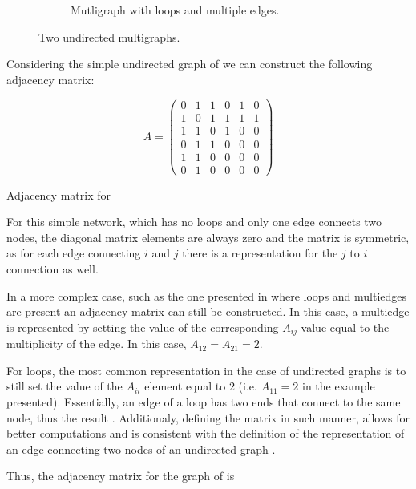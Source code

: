 \begin{figure}
\begin{subfigure}[t]{0.4\textwidth}
         \caption{Mutligraph with loops and multiple edges.}
         \label{fig:compl_adj_demo}
     \end{subfigure}
        \caption{Two undirected multigraphs.}
        \label{fig:two multigraphs}
\end{figure}

Considering the simple undirected graph of  we can construct
the following adjacency matrix:
\begin{table}[H]
  
  \begin{equation*}
    A = 
    \begin{pmatrix}
      0 & 1 & 1 & 0 & 1 & 0 \\
      1 & 0 & 1 & 1 & 1 & 1 \\
      1 & 1 & 0 & 1 & 0 & 0 \\
      0 & 1 & 1 & 0 & 0 & 0 \\
      1 & 1 & 0 & 0 & 0 & 0 \\
      0 & 1 & 0 & 0 & 0 & 0 
    \end{pmatrix}
  \end{equation*}
  \caption{Adjacency matrix for }
\end{table}

For this simple network, which has no loops and only one edge connects two nodes,
the diagonal matrix elements are always zero and the matrix is symmetric, as for
each edge connecting $i$ and $j$ there is a representation for the $j$ to $i$ connection
as well.

In a more complex case, such as the one presented in  where loops
and multiedges are present an adjacency matrix can still be constructed. In this case,
a multiedge is represented by setting the value of the corresponding $A_{ij}$ value equal
to the multiplicity of the edge. In this case, $A_{12} = A_{21} = 2$.

For loops, the most common representation in the case of undirected
graphs is to still set the value of the $A_{ii}$ element equal to $2$
(i.e. $A_{11} = 2$ in the example presented).  Essentially, an edge of
a loop has two ends that connect to the same node, thus the result
\cite[p.~68]{book:algebraic}. Additionaly, defining the matrix in such
manner, allows for better computations and is consistent with the
definition of the representation of an edge connecting two nodes of an
undirected graph \cite[p.~108]{book:Newman}. 

Thus, the adjacency matrix for the graph of  is

